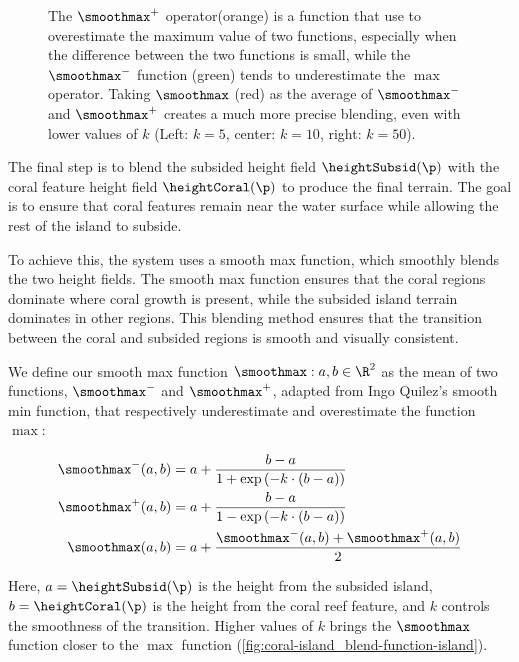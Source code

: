 \begin{figure}[H]
    \caption{The $\smoothmax^+$ operator(orange) is a function that use to overestimate the maximum value of two functions, especially when the difference between the two functions is small, while the $\smoothmax^-$ function (green) tends to underestimate the $\max$ operator. Taking $\smoothmax$ (red) as the average of $\smoothmax^-$ and $\smoothmax^+$ creates a much more precise blending, even with lower values of $k$ (Left: $k=5$, center: $k=10$, right: $k=50$).}
    \label{fig:coral-island_blend-function-island-with-upper}
\end{figure}

The final step is to blend the subsided height field $\heightSubsid(\p)$ with the coral feature height field $\heightCoral(\p)$ to produce the final terrain. The goal is to ensure that coral features remain near the water surface while allowing the rest of the island to subside.

To achieve this, the system uses a smooth max function, which smoothly blends the two height fields. The smooth max function ensures that the coral regions dominate where coral growth is present, while the subsided island terrain dominates in other regions. This blending method ensures that the transition between the coral and subsided regions is smooth and visually consistent.

We define our smooth max function $\smoothmax: a, b \in \R^2$ as the mean of two functions, $\smoothmax^-$ and $\smoothmax^+$, adapted from Ingo Quilez's smooth min function, that respectively underestimate and overestimate the function $\max$:

\begin{align}
    \smoothmax^-(a, b) &= a + \frac{b - a}{1 + \exp\left(-k \cdot (b - a) \right)} \\
    \smoothmax^+(a, b) &= a + \frac{b - a}{1 - \exp\left(-k \cdot (b - a) \right)} \\
    \smoothmax(a, b)   &= a + \frac{\smoothmax^-(a, b) + \smoothmax^+(a, b)}{2} %
\end{align}

Here, $a = \heightSubsid(\p)$ is the height from the subsided island, $b = \heightCoral(\p)$ is the height from the coral reef feature, and $k$ controls the smoothness of the transition. Higher values of $k$ brings the $\smoothmax$ function closer to the $\max$ function (\cref{fig:coral-island_blend-function-island}).

